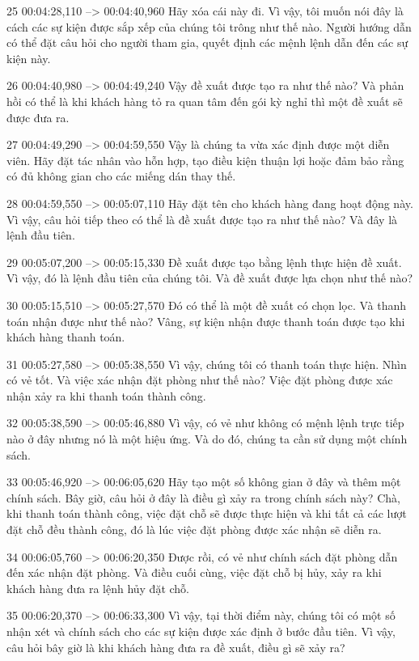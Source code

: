 25
00:04:28,110 --> 00:04:40,960
Hãy xóa cái này đi.  Vì vậy, tôi muốn nói đây là cách các sự kiện được sắp xếp của chúng tôi trông như thế nào.  Người hướng dẫn có thể đặt câu hỏi cho người tham gia, quyết định các mệnh lệnh dẫn đến các sự kiện này.

26
00:04:40,980 --> 00:04:49,240
Vậy đề xuất được tạo ra như thế nào?  Và phản hồi có thể là khi khách hàng tỏ ra quan tâm đến gói kỳ nghỉ thì một đề xuất sẽ được đưa ra.

27
00:04:49,290 --> 00:04:59,550
Vậy là chúng ta vừa xác định được một diễn viên.  Hãy đặt tác nhân vào hỗn hợp, tạo điều kiện thuận lợi hoặc đảm bảo rằng có đủ không gian cho các miếng dán thay thế.

28
00:04:59,550 --> 00:05:07,110
Hãy đặt tên cho khách hàng đang hoạt động này.  Vì vậy, câu hỏi tiếp theo có thể là đề xuất được tạo ra như thế nào?  Và đây là lệnh đầu tiên.

29
00:05:07,200 --> 00:05:15,330
Đề xuất được tạo bằng lệnh thực hiện đề xuất.  Vì vậy, đó là lệnh đầu tiên của chúng tôi.  Và đề xuất được lựa chọn như thế nào?

30
00:05:15,510 --> 00:05:27,570
Đó có thể là một đề xuất có chọn lọc.  Và thanh toán nhận được như thế nào?  Vâng, sự kiện nhận được thanh toán được tạo khi khách hàng thanh toán.

31
00:05:27,580 --> 00:05:38,550
Vì vậy, chúng tôi có thanh toán thực hiện.  Nhìn có vẻ tốt.  Và việc xác nhận đặt phòng như thế nào?  Việc đặt phòng được xác nhận xảy ra khi thanh toán thành công.

32
00:05:38,590 --> 00:05:46,880
Vì vậy, có vẻ như không có mệnh lệnh trực tiếp nào ở đây nhưng nó là một hiệu ứng.  Và do đó, chúng ta cần sử dụng một chính sách.

33
00:05:46,920 --> 00:06:05,620
Hãy tạo một số không gian ở đây và thêm một chính sách.  Bây giờ, câu hỏi ở đây là điều gì xảy ra trong chính sách này?  Chà, khi thanh toán thành công, việc đặt chỗ sẽ được thực hiện và khi tất cả các lượt đặt chỗ đều thành công, đó là lúc việc đặt phòng được xác nhận sẽ diễn ra.

34
00:06:05,760 --> 00:06:20,350
Được rồi, có vẻ như chính sách đặt phòng dẫn đến xác nhận đặt phòng.  Và điều cuối cùng, việc đặt chỗ bị hủy, xảy ra khi khách hàng đưa ra lệnh hủy đặt chỗ.

35
00:06:20,370 --> 00:06:33,300
Vì vậy, tại thời điểm này, chúng tôi có một số nhận xét và chính sách cho các sự kiện được xác định ở bước đầu tiên.  Vì vậy, câu hỏi bây giờ là khi khách hàng đưa ra đề xuất, điều gì sẽ xảy ra?

